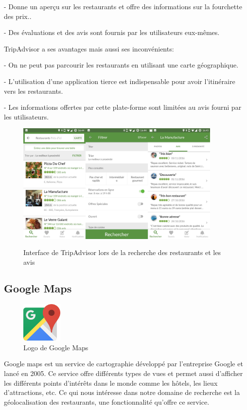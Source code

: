 	\tab- Donne un aperçu sur les restaurants et offre des informations sur la fourchette des prix..\medskip

	\tab- Des évaluations et des avis sont fournis par les utilisateurs eux-mêmes.\bigskip

TripAdvisor a ses avantages mais aussi ses inconvénients:\bigskip

	\tab- On ne peut pas parcourir les restaurants en utilisant une carte géographique.\medskip

	\tab- L'utilisation d'une application tierce est indispensable pour avoir l'itinéraire vers les restaurants.\medskip

	\tab- Les informations offertes par cette plate-forme sont limitées au avis fourni par les utilisateurs.
 

	\begin{figure}[!ht]

		\centering
		\includegraphics[width=4in]{images/Chapitre1/trip_advisor.jpeg}
		\label{fig:label}
		\caption{Interface de TripAdvisor lors de la recherche des restaurants et les avis}
	 \end{figure}
\newpage
\subsection{Google Maps}
\begin{figure}
	\vspace{-15pt}
	\includegraphics[width=2cm]{images/Chapitre1/googlemaps.png}
	\vspace{-20pt}
	\caption{{\footnotesize Logo de Google Maps}}
 \end{figure}
Google maps est un service de cartographie développé par l'entreprise Google et lancé en 2005. Ce service offre différents types de vues et permet aussi d'afficher les différents points d'intérêts dans le monde comme les hôtels, les lieux d'attractions, etc. Ce qui nous intéresse dans notre domaine de recherche est la géolocalisation des restaurants, une fonctionnalité qu'offre ce service.

